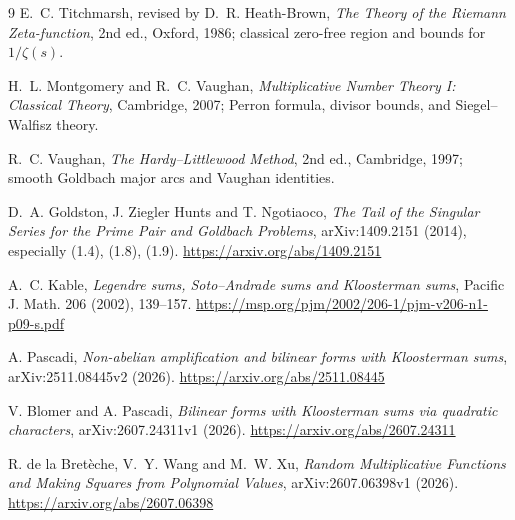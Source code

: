 \documentclass[11pt,a4paper]{ctexart}
\theoremstyle{definition}
\newcommand{\1}{\mathbf 1}
\begin{document}
\begin{thebibliography}{9}
E.~C. Titchmarsh, revised by D.~R. Heath-Brown,
\emph{The Theory of the Riemann Zeta-function}, 2nd ed., Oxford, 1986;
classical zero-free region and bounds for $1/\zeta(s)$.

H.~L. Montgomery and R.~C. Vaughan,
\emph{Multiplicative Number Theory I: Classical Theory}, Cambridge, 2007;
Perron formula, divisor bounds, and Siegel--Walfisz theory.

R.~C. Vaughan,
\emph{The Hardy--Littlewood Method}, 2nd ed., Cambridge, 1997;
smooth Goldbach major arcs and Vaughan identities.

D.~A. Goldston, J. Ziegler Hunts and T. Ngotiaoco,
\emph{The Tail of the Singular Series for the Prime Pair and Goldbach Problems},
arXiv:1409.2151 (2014), especially (1.4), (1.8), (1.9).
\url{https://arxiv.org/abs/1409.2151}

A.~C. Kable,
\emph{Legendre sums, Soto--Andrade sums and Kloosterman sums},
Pacific J. Math. 206 (2002), 139--157.
\url{https://msp.org/pjm/2002/206-1/pjm-v206-n1-p09-s.pdf}

A. Pascadi,
\emph{Non-abelian amplification and bilinear forms with Kloosterman sums},
arXiv:2511.08445v2 (2026).
\url{https://arxiv.org/abs/2511.08445}

V. Blomer and A. Pascadi,
\emph{Bilinear forms with Kloosterman sums via quadratic characters},
arXiv:2607.24311v1 (2026).
\url{https://arxiv.org/abs/2607.24311}

R. de la Bret\`eche, V.~Y. Wang and M.~W. Xu,
\emph{Random Multiplicative Functions and Making Squares from Polynomial Values},
arXiv:2607.06398v1 (2026).
\url{https://arxiv.org/abs/2607.06398}
\end{thebibliography}
\end{document}
